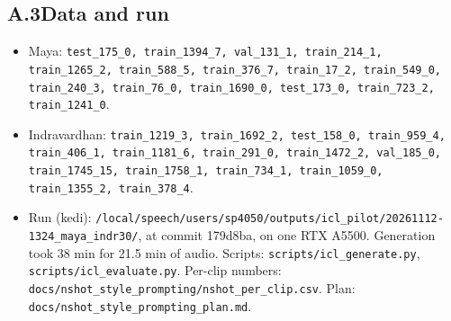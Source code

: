 \documentclass[11pt]{article}
\begin{document}
\subsection*{A.3\quad Data and run}
\begin{itemize}
\item Maya: \texttt{test\_175\_0, train\_1394\_7, val\_131\_1, train\_214\_1, train\_1265\_2, train\_588\_5, train\_376\_7, train\_17\_2, train\_549\_0, train\_240\_3, train\_76\_0, train\_1690\_0, test\_173\_0, train\_723\_2, train\_1241\_0}.
\item Indravardhan: \texttt{train\_1219\_3, train\_1692\_2, test\_158\_0, train\_959\_4, train\_406\_1, train\_1181\_6, train\_291\_0, train\_1472\_2, val\_185\_0, train\_1745\_15, train\_1758\_1, train\_734\_1, train\_1059\_0, train\_1355\_2, train\_378\_4}.
\item Run (kedi): \texttt{/local/speech/users/sp4050/outputs/icl\_pilot/}\allowbreak\texttt{20261112-1324\_maya\_indr30/}, at commit 179d8ba, on one RTX A5500. Generation took 38 min for 21.5 min of audio. Scripts: \texttt{scripts/icl\_generate.py}, \texttt{scripts/icl\_evaluate.py}. Per-clip numbers: \texttt{docs/nshot\_style\_prompting/}\allowbreak\texttt{nshot\_per\_clip.csv}. Plan: \texttt{docs/nshot\_style\_prompting\_plan.md}.
\end{itemize}
\end{document}

